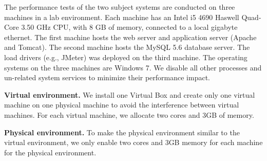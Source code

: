 The performance tests of the two subject systems are conducted on three machines in a lab environment. Each machine has an Intel i5 4690 Haswell Quad-Core 3.50 GHz CPU, with 8 GB of memory, connected to a local gigabyte ethernet. The first machine hosts the web server and application server (Apache and Tomcat). The second machine hosts the MySQL 5.6 database server. The load drivers (e.g., JMeter) was deployed on the third machine. The operating systems on the three machines are Windows 7. We disable all other processes and un-related system services to minimize their performance impact.

\noindent \textbf{Virtual environment.} We install one Virtual Box  and create only one virtual machine on one physical machine to avoid the interference between virtual machines. For each virtual machine, we allocate two cores and 3GB of memory. 


\noindent \textbf{Physical environment.} To make the physical environment similar to the virtual environment, we only enable two cores and 3GB memory for each machine for the physical environment. 


